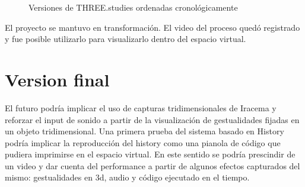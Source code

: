 \begin{figure}[tb]
\centering
{} \quad
{} 
\caption[Versiones de THREE.studies]{Versiones de THREE.studies ordenadas cronológicamente} %
\label{fig:esempio}
\end{figure}

El proyecto se mantuvo en transformación. El video del proceso quedó registrado y fue posible utilizarlo para visualizarlo dentro del espacio virtual. 

\section{Version final}

El futuro podría implicar el uso de capturas tridimensionales de Iracema y reforzar el input de sonido a partir de la visualización de gestualidades fijadas en un objeto tridimensional. Una primera prueba del sistema basado en History podría implicar la reproducción del history como una pianola de código que pudiera imprimirse en el espacio virtual. En este sentido se podría prescindir de un video y dar cuenta del performance a partir de algunos efectos capturados del mismo: gestualidades en 3d, audio y código ejecutado en el tiempo. 
